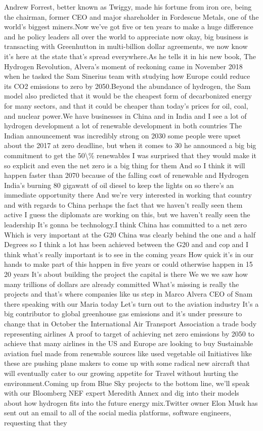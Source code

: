 \documentclass{article}%
\begin{document}
Andrew Forrest, better known as Twiggy, made his fortune from iron ore, being the chairman, former CEO and major shareholder in Fordescue Metals, one of the world's biggest miners.Now we've got five or ten years to make a huge difference and he policy leaders all over the world to appreciate now okay, big business is transacting with Greenhutton in multi{-}billion dollar agreements, we now know it's here at the state that's spread everywhere.As he tells it in his new book, The Hydrogen Revolution, Alvera's moment of reckoning came in November 2018 when he tasked the Sam Sinerius team with studying how Europe could reduce its CO2 emissions to zero by 2050.Beyond the abundance of hydrogen, the Sam model also predicted that it would be the cheapest form of decarbonized energy for many sectors, and that it could be cheaper than today's prices for oil, coal, and nuclear power.We have businesses in China and in India and I see a lot of hydrogen development a lot of renewable development in both countries The Indian announcement was incredibly strong on 2030 some people were upset about the 2017 at zero deadline, but when it comes to 30 he announced a big big commitment to get the 50\textbackslash{}\% renewables I was surprised that they would make it so explicit and even the net zero is a big thing for them And so I think it will happen faster than 2070 because of the falling cost of renewable and Hydrogen India's burning 80 gigawatt of oil diesel to keep the lights on so there's an immediate opportunity there And we're very interested in working that country and with regards to China perhaps the fact that we haven't really seen them active I guess the diplomats are working on this, but we haven't really seen the leadership It's gonna be technology.I think China has committed to a net zero Which is very important at the G20 China was clearly behind the one and a half Degrees so I think a lot has been achieved between the G20 and and cop and I think what's really important is to see in the coming years How quick it's in our hands to make part of this happen in five years or could otherwise happen in 15 20 years It's about building the project the capital is there We we we saw how many trillions of dollars are already committed What's missing is really the projects and that's where companies like us step in Marco Alvera CEO of Snam there speaking with our Maria today Let's turn out to the aviation industry It's a big contributor to global greenhouse gas emissions and it's under pressure to change that in October the International Air Transport Association a trade body representing airlines A proof to target of achieving net zero emissions by 2050 to achieve that many airlines in the US and Europe are looking to buy Sustainable aviation fuel made from renewable sources like used vegetable oil Initiatives like these are pushing plane makers to come up with some radical new aircraft that will eventually cater to our growing appetite for Travel without hurting the environment.Coming up from Blue Sky projects to the bottom line, we'll speak with our Bloomberg NEF expert Meredith Annex and dig into their models about how hydrogen fits into the future energy mix.Twitter owner Elon Musk has sent out an email to all of the social media platforms, software engineers, requesting that they 
\end{document}
